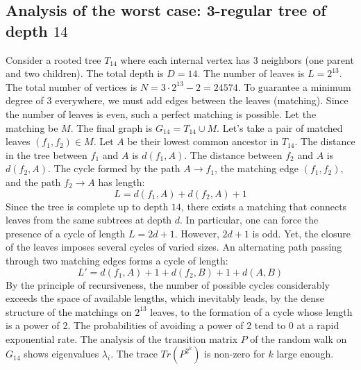 \documentclass[12pt,a4paper]{article}
\begin{document}
\subsection{Analysis of the worst case: 3-regular tree of depth $14$}
Consider a rooted tree $T_{14}$ where each internal vertex has 3 neighbors (one parent and two children).
The total depth is $D = 14$.
The number of leaves is $L = 2^{13}$.
The total number of vertices is $N = 3 \cdot 2^{13} - 2 = 24574$.
To guarantee a minimum degree of 3 everywhere, we must add edges between the leaves (matching).
Since the number of leaves is even, such a perfect matching is possible.
Let the matching be $M$. The final graph is $G_{14} = T_{14} \cup M$.
Let's take a pair of matched leaves $(f_1, f_2) \in M$.
Let $A$ be their lowest common ancestor in $T_{14}$.
The distance in the tree between $f_1$ and $A$ is $d(f_1, A)$.
The distance between $f_2$ and $A$ is $d(f_2, A)$.
The cycle formed by the path $A \to f_1$, the matching edge $(f_1, f_2)$, and the path $f_2 \to A$ has length:
$$ L = d(f_1, A) + d(f_2, A) + 1 $$
Since the tree is complete up to depth $14$, there exists a matching that connects leaves from the same subtrees at depth $d$.
In particular, one can force the presence of a cycle of length $L = 2d + 1$. However, $2d+1$ is odd.
Yet, the closure of the leaves imposes several cycles of varied sizes. An alternating path passing through two matching edges forms a cycle of length:
$$ L' = d(f_1, A) + 1 + d(f_2, B) + 1 + d(A, B) $$
By the principle of recursiveness, the number of possible cycles considerably exceeds the space of available lengths, which inevitably leads, by the dense structure of the matchings on $2^{13}$ leaves, to the formation of a cycle whose length is a power of 2. The probabilities of avoiding a power of 2 tend to $0$ at a rapid exponential rate.
The analysis of the transition matrix $P$ of the random walk on $G_{14}$ shows eigenvalues $\lambda_i$. The trace $Tr(P^{2^k})$ is non-zero for $k$ large enough.
\end{document}
